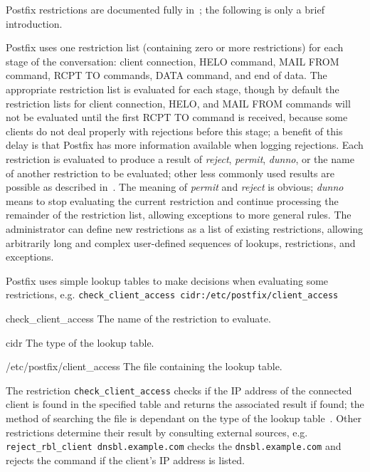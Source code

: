 \label{Mixing and matching Postfix restrictions}

Postfix restrictions are documented fully in~\cite{smtpd_per_user_control,
policy-servers, smtpd_access_readme}; the following is only a brief
introduction.

Postfix uses one restriction list (containing zero or more restrictions)
for each stage of the  conversation: client connection, HELO
command, MAIL FROM command, RCPT TO commands, DATA command, and end of
data.  The appropriate restriction list is evaluated for each stage, though
by default the restriction lists for client connection, HELO, and MAIL FROM
commands will not be evaluated until the first RCPT TO command is received,
because some clients do not deal properly with rejections before this
stage; a benefit of this delay is that Postfix has more information
available when logging rejections.  Each restriction is evaluated to
produce a result of \textit{reject}, \textit{permit}, \textit{dunno}, or
the name of another restriction to be evaluated; other less commonly used
results are possible as described in~\cite{access-man-page}.  The meaning
of \textit{permit\/} and \textit{reject\/} is obvious; \textit{dunno\/}
means to stop evaluating the current restriction and continue processing
the remainder of the restriction list, allowing exceptions to more general
rules.  The administrator can define new restrictions as a list of existing
restrictions, allowing arbitrarily long and complex user-defined sequences
of lookups, restrictions, and exceptions.

Postfix uses simple lookup tables to make decisions when evaluating some
restrictions, e.g.\newline{}
\tab{}\texttt{check\_client\_access~cidr:/etc/postfix/client\_access}

\begin{boldeqlist}

    \item [check\_client\_access] The name of the restriction to evaluate.

    \item [cidr] The type of the lookup table.

    \item [/etc/postfix/client\_access] The file containing the lookup
        table.

\end{boldeqlist}

The restriction \texttt{check\_client\_access} checks if the IP address of
the connected client is found in the specified table and returns the
associated result if found; the method of searching the file is dependant
on the type of the lookup table~\cite{postfix-lookup-tables}.  Other
restrictions determine their result by consulting external sources,
e.g.\newline{} \tab{}\texttt{reject\_rbl\_client
dnsbl.example.com}\newline{} checks the 
\texttt{dnsbl.example.com} and rejects the command if the client's IP
address is listed.

